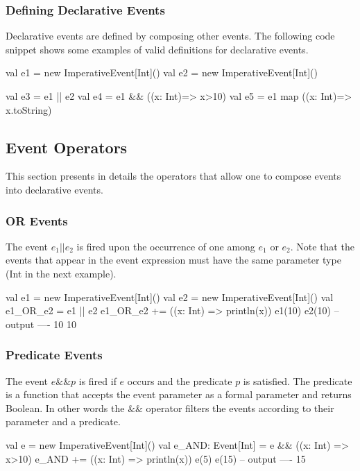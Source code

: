 \documentclass[10pt,a4paper]{article}
\newcommand{\code}[1]{{\fontfamily{cmtt}\small\selectfont#1}}
\begin{document}
\subsubsection{Defining Declarative Events}

Declarative events are defined by composing other events. The
following code snippet shows some examples of valid definitions for
declarative events.

\begin{codenv}
val e1 = new ImperativeEvent[Int]()
val e2 = new ImperativeEvent[Int]()

val e3 = e1 || e2
val e4 = e1 && ((x: Int)=> x>10)
val e5 = e1 map ((x: Int)=> x.toString)
\end{codenv}


\subsection{Event Operators}

This section presents in details the operators that allow one to
compose events into declarative events.

\subsubsection{OR Events}

The event $e_1 || e_2$ is fired upon the occurrence of one among $e_1$
or $e_2$. Note that the events that appear in the event expression
must have the same parameter type (\code{Int} in the next example).

\begin{codenv}
val e1 = new ImperativeEvent[Int]()
val e2 = new ImperativeEvent[Int]()
val e1_OR_e2 = e1 || e2
e1_OR_e2 += ((x: Int) => println(x))
e1(10)
e2(10)
-- output ----
10
10
\end{codenv}


\subsubsection{Predicate Events}

The event $e \&\& p$ is fired if $e$ occurs and the predicate $p$ is
satisfied. The predicate is a function that accepts the event
parameter as a formal parameter and returns \code{Boolean}. In other
words the $\&\&$ operator filters the events according to their
parameter and a predicate.

\begin{codenv}
val e = new ImperativeEvent[Int]()
val e_AND: Event[Int] = e && ((x: Int) => x>10)
e_AND += ((x: Int) => println(x))
e(5)
e(15)
-- output ----
15
\end{codenv}
\end{document}
